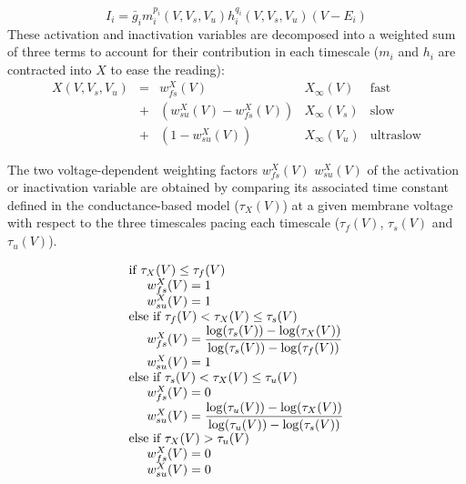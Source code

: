 $$I_{i} = \bar{g}_{i} m^{p_i}_{i}(V,V_s, V_u) h^{q_i}_{i}(V,V_s,V_u) (V - E_i)$$
These activation and inactivation variables are decomposed into a weighted sum of three terms to account for their contribution in each timescale ($m_i$ and $h_i$ are contracted into $X$ to ease the reading):
\[
\begin{array}{lllll}
	X(V,V_s,V_u)   &=&   w_{fs}^X(V) &X_\infty(V) &\text{fast}\\ 
	&+& (w_{su}^{X}(V) - w_{fs}^{X}(V)) &X_{\infty}(V_s) & \text{slow}\\
	 &+& (1-w_{su}^{X}(V)) &X_{\infty}(V_{u}) & \text{ultraslow}
\end{array}
\]

The two voltage-dependent weighting factors $w^X_{fs}(V)$ $w^X_{su}(V)$  of the activation or inactivation variable are obtained by comparing its associated time constant defined in the conductance-based model ($\tau_X(V)$) at a given membrane voltage with respect to the three timescales pacing each timescale ($\tau_{f}(V)$, $\tau_{s}(V)$  and $\tau_{u}(V)$). 

\[
\begin{array}{l}
\text{if  } \tau_X(V) \leq \tau_f(V)\\
\text{\hspace{0.5cm}} w^X_{fs}(V) = 1 \\
\text{\hspace{0.5cm}} w^X_{su}(V) = 1 \\
\text{else if  } \tau_f(V) < \tau_X(V) \leq \tau_s(V)\\
\text{\hspace{0.5cm}} w^X_{fs}(V) = \dfrac{\log(\tau_s(V)) - \log(\tau_X(V))}{\log(\tau_s(V)) - \log(\tau_f(V))}\\
\text{\hspace{0.5cm}} w^X_{su}(V) =1\\
\text{else if  } \tau_s(V) < \tau_X(V) \leq \tau_u(V)\\
\text{\hspace{0.5cm}} w^X_{fs}(V) =0\\
\text{\hspace{0.5cm}} w^X_{su}(V) = \dfrac{\log(\tau_u(V)) - \log(\tau_X(V))}{\log(\tau_u(V)) - \log(\tau_s(V))}\\
\text{else if  } \tau_X(V) > \tau_u(V)\\
\text{\hspace{0.5cm}} w^X_{fs}(V) =0\\
\text{\hspace{0.5cm}} w^X_{su}(V) =0\\
\end{array}
\]

